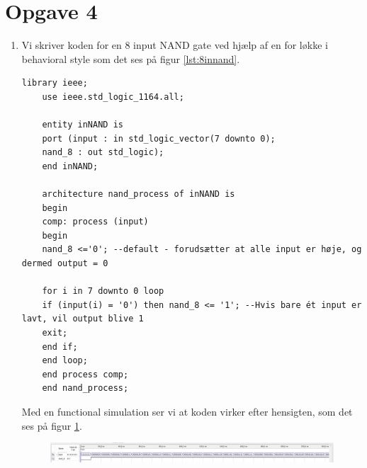 \section{Opgave 4}
\begin{enumerate}
	\item[1)]
	Vi skriver koden for en 8 input NAND gate ved hjælp af en for løkke i behavioral style som det ses på figur \ref{lst:8innand}.\\
	\begin{lstlisting}[caption={Behavioral style kode en 8 input NAND gate},label={lst:8innand}]
	library ieee;
	use ieee.std_logic_1164.all;
	
	entity inNAND is
	port (input : in std_logic_vector(7 downto 0);
	nand_8 : out std_logic);
	end inNAND;
	
	architecture nand_process of inNAND is
	begin
	comp: process (input)
	begin
	nand_8 <='0'; --default - forudsætter at alle input er høje, og dermed output = 0
	
	for i in 7 downto 0 loop
	if (input(i) = '0') then nand_8 <= '1'; --Hvis bare ét input er lavt, vil output blive 1
	exit;
	end if;
	end loop;
	end process comp;
	end nand_process;
	\end{lstlisting}
	Med en functional simulation ser vi at koden virker efter hensigten, som det ses på figur \ref{fig:8innand}.\\
	\begin{figure}[h]
		\centering
		\includegraphics[scale=0.8]{pictures/Oevelse5/opg4/func_sim_8nand.JPG}
		\caption{}
		\label{fig:8innand}
	\end{figure}
\end{enumerate}
